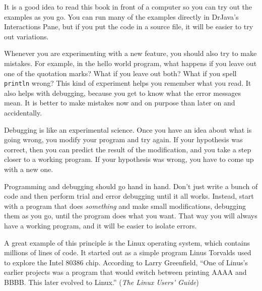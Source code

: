 \documentclass[12pt]{book}
\theoremstyle{exercise}
\newcommand{\java}[1]{\verb"#1"}
\newcommand{\java}[1]{\lstinline{#1}} %
\begin{document}
It is a good idea to read this book in front of a computer so you can try out the examples as you go.
You can run many of the examples directly in DrJava's Interactions Pane, but if you put the code in a source file, it will be easier to try out variations.

Whenever you are experimenting with a new feature, you should also try to make mistakes.
For example, in the hello world program, what happens if you leave out one of the quotation marks?
What if you leave out both?
What if you spell \java{println} wrong?
This kind of experiment helps you remember what you read.
It also helps with debugging, because you get to know what the error messages mean.
It is better to make mistakes now and on purpose than later on and accidentally.



Debugging is like an experimental science.
Once you have an idea about what is going wrong, you modify your program and try again.
If your hypothesis was correct, then you can predict the result of the modification, and you take a step closer to a working program.
If your hypothesis was wrong, you have to come up with a new one.

Programming and debugging should go hand in hand.
Don't just write a bunch of code and then perform trial and error debugging until it all works.
Instead, start with a program that does {\em something} and make small modifications, debugging them as you go, until the program does what you want.
That way you will always have a working program, and it will be easier to isolate errors.


A great example of this principle is the Linux operating system, which contains millions of lines of code.
It started out as a simple program Linus Torvalds used to explore the Intel 80386 chip.
According to Larry Greenfield, ``One of Linus's earlier projects was a program that would switch between printing AAAA and BBBB.
This later evolved to Linux.'' ({\em The Linux Users' Guide})

\end{document}
